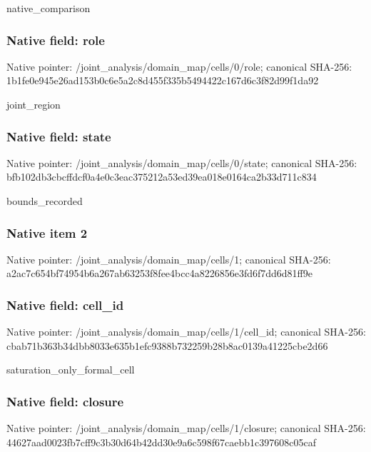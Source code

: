 \documentclass[10pt,a4paper]{article}
\begin{document}
\begingroup\raggedright\sloppy native\_\allowbreak{}comparison\par\endgroup

\subsubsection{Native field: role}
Native pointer: /joint\_\allowbreak{}analysis/domain\_\allowbreak{}map/cells/0/role; canonical SHA-256: 1b1fe0e945e26ad153b0c6e5a2c8d455f335b5494422c167d6c3f82d99f1da92

\begingroup\raggedright\sloppy joint\_\allowbreak{}region\par\endgroup

\subsubsection{Native field: state}
Native pointer: /joint\_\allowbreak{}analysis/domain\_\allowbreak{}map/cells/0/state; canonical SHA-256: bfb102db3cbcffdcf0a4e0c3eac375212a53ed39ea018e0164ca2b33d711c834

\begingroup\raggedright\sloppy bounds\_\allowbreak{}recorded\par\endgroup

\subsubsection{Native item 2}
Native pointer: /joint\_\allowbreak{}analysis/domain\_\allowbreak{}map/cells/1; canonical SHA-256: a2ac7c654bf74954b6a267ab63253f8fee4bcc4a8226856e3fd6f7dd6d81ff9e

\subsubsection{Native field: cell\_\allowbreak{}id}
Native pointer: /joint\_\allowbreak{}analysis/domain\_\allowbreak{}map/cells/1/cell\_\allowbreak{}id; canonical SHA-256: cbab71b363b34dbb8033e635b1efc9388b732259b28b8ac0139a41225cbe2d66

\begingroup\raggedright\sloppy saturation\_\allowbreak{}only\_\allowbreak{}formal\_\allowbreak{}cell\par\endgroup

\subsubsection{Native field: closure}
Native pointer: /joint\_\allowbreak{}analysis/domain\_\allowbreak{}map/cells/1/closure; canonical SHA-256: 44627aad0023fb7cff9c3b30d64b42dd30e9a6c598f67caebb1c397608c05caf
\end{document}
